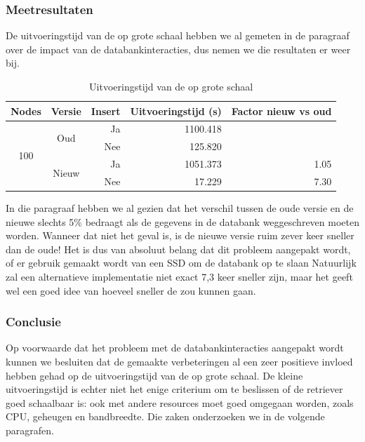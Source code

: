 \subsubsection{Meetresultaten}

De uitvoeringstijd van de \nwmretriever{} op grote schaal hebben we al gemeten in de paragraaf over de impact van de databankinteracties,
dus nemen we die resultaten er weer bij.

\begin{table}[h]
\centering
\begin{tabular}{@{}ccrrr@{}}
\toprule
\multicolumn{1}{l}{Nodes} & \multicolumn{1}{l}{Versie} & Insert & Uitvoeringstijd (s) & Factor nieuw vs oud \\ \midrule
\multirow{4}{*}{100}      & \multirow{2}{*}{Oud}       & Ja     & 1100.418            &                     \\
                          &                            & Nee    & 125.820             &                     \\
                          & \multirow{2}{*}{Nieuw}     & Ja     & 1051.373            & 1.05                \\
                          &                            & Nee    & 17.229              & 7.30                \\ \bottomrule
\end{tabular}
\caption{Uitvoeringstijd van de \nwmretriever{} op grote schaal}
\label{tabel-uitvoeringstijd-vwall}
\end{table}

In die paragraaf hebben we al gezien dat het verschil tussen de oude versie en de nieuwe slechts 5\% bedraagt
als de gegevens in de databank weggeschreven moeten worden.
Wanneer dat niet het geval is, is de nieuwe versie ruim zever keer sneller dan de oude!
Het is dus van absoluut belang dat dit probleem aangepakt wordt, of er gebruik gemaakt wordt van een SSD om de databank op te slaan
Natuurlijk zal een alternatieve implementatie niet exact 7,3 keer sneller zijn, maar het geeft wel een goed idee
van hoeveel sneller de \nwmretriever{} zou kunnen gaan.

\subsubsection{Conclusie}

Op voorwaarde dat het probleem met de databankinteracties aangepakt wordt kunnen we besluiten dat de gemaakte verbeteringen
al een zeer positieve invloed hebben gehad op de uitvoeringstijd van de \nwmretriever{} op grote schaal.
De kleine uitvoeringstijd is echter niet het enige criterium om te beslissen of de retriever goed schaalbaar is:
ook met andere resources moet goed omgegaan worden, zoals CPU, geheugen en bandbreedte.
Die zaken onderzoeken we in de volgende paragrafen.


